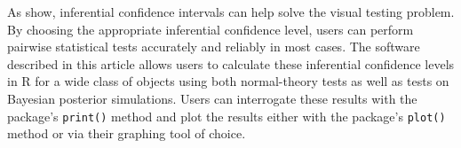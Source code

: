 As \citet{armstrong_2025} show, inferential confidence intervals can help solve the visual testing problem. By choosing the appropriate inferential confidence level, users can perform pairwise statistical tests accurately and reliably in most cases. The software described in this article allows users to calculate these inferential confidence levels in R for a wide class of objects using both normal-theory tests as well as tests on Bayesian posterior simulations. Users can interrogate these results with the package's \texttt{print()} method and plot the results either with the package's \texttt{plot()} method or via their graphing tool of choice.

\clearpage



\address{%
William Poirier\\
Western University\\%
Department of Political Science\\ London, Canada\\
%
\url{https://williampo1.github.io/}\\%
\textit{ORCiD: \href{https://orcid.org/0000-0002-3274-1351}{0000-0002-3274-1351}}\\%
\href{mailto:wpoirier@uwo.ca}{\nolinkurl{wpoirier@uwo.ca}}%
}

\address{%
David A. Armstrong\\
Western University\\%
Department of Political Science\\ London, Canada\\
%
\url{https://www.quantoid.ca/}\\%
\textit{ORCiD: \href{https://orcid.org/0000-0002-9358-2489}{0000-0002-9358-2489}}\\%
\href{mailto:dave.armstrong@uwo.ca}{\nolinkurl{dave.armstrong@uwo.ca}}%
}
